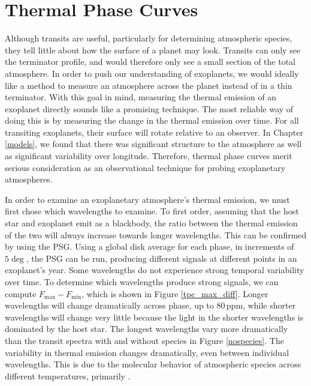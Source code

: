 \chapter{Thermal Phase Curves}
\label{thermalphasecurves}
Although transits are useful, particularly for determining atmospheric species,
 they tell little about how the surface of a
 planet may look. Transits can only see the terminator profile, and would
 therefore only see a small section of the total atmosphere. In order to push
 our understanding of exoplanets, we would ideally like a method to measure an
 atmosphere across the planet instead of in a thin terminator. With this goal
 in mind, measuring the thermal emission of an exoplanet directly sounds like
 a promising technique. The most reliable way of doing this is by measuring the
 change
 in the thermal emission over time. For all transiting exoplanets, their
 surface will rotate relative to an observer. In Chapter \ref{models}, we
 found that there was significant structure to the atmosphere as well as
 significant variability over longitude. Therefore, thermal phase curves
 merit serious consideration as an observational technique for probing
 exoplanetary atmospheres.

In order to examine an exoplanetary atmosphere's thermal emission, we must first
 chose which wavelengths to examine. To first order, assuming that the host star
 and exoplanet emit as a blackbody, the ratio between the thermal emission of
 the two will always increase towards longer wavelengths. This can be confirmed
 by using the PSG. Using a global disk average for each phase, in increments of
 $5\deg$, the PSG can be run, producing different signals at different points in an exoplanet's year. Some wavelengths do not experience strong temporal
 variability over time. To determine which wavelengths produce strong signals,
 we can compute $F_\mathrm{max}-F_\mathrm{min}$, which is shown in Figure
 \ref{tpc_max_diff}. Longer wavelengths will change dramatically across phase,
 up to $80\,\mathrm{ppm}$, while shorter wavelengths will change very little
 because the light in the shorter wavelengths is dominated by the host star.
 The longest wavelengths vary more dramatically than the transit spectra with
 and without species in Figure \ref{nospecies}. The variability in thermal emission
 changes dramatically, even between individual wavelengths. This is due to the
 molecular behavior of atmospheric species across different temperatures,
 primarily .

